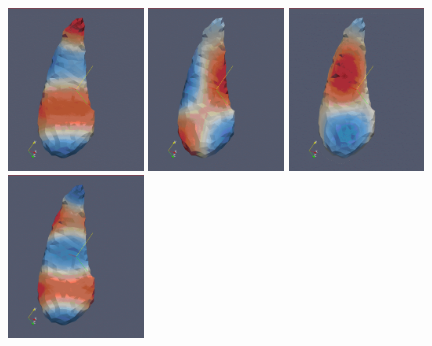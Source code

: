 \documentclass{InsightArticle}
\begin{document}
\begin{figure}
\includegraphics[width=0.32\textwidth]{SurfaceHarmonic_6.png}
\includegraphics[width=0.32\textwidth]{SurfaceHarmonic_7.png}
\includegraphics[width=0.32\textwidth]{SurfaceHarmonic_8.png}
\includegraphics[width=0.32\textwidth]{SurfaceHarmonic_9.png}
\label{fig:HippocampusSurfaceHarmonics}
\end{figure}
\end{document}
